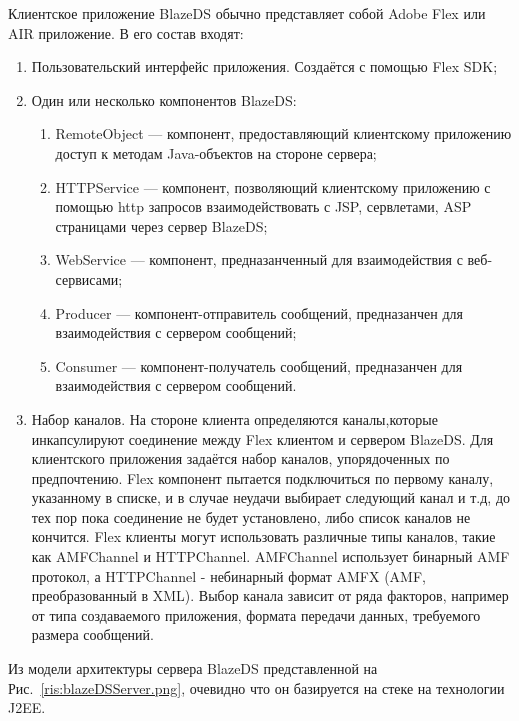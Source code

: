 Клиентское приложение BlazeDS обычно представляет собой Adobe Flex или AIR приложение. В его состав входят: 

\begin{enumerate}
\item Пользовательский интерфейс приложения. Создаётся с помощью Flex SDK;
\item Один или несколько компонентов BlazeDS: 
\begin{enumerate}
\item RemoteObject --- компонент, предоставляющий клиентскому приложению доступ к методам Java-объектов на стороне сервера; 
\item HTTPService --- компонент, позволяющий клиентскому приложению с помощью http запросов взаимодействовать с JSP, сервлетами, 
ASP страницами через сервер BlazeDS;
\item WebService --- компонент, предназанченный для взаимодействия с веб-сервисами;
\item Producer --- компонент-отправитель сообщений, предназанчен для взаимодействия с сервером сообщений;
\item Consumer --- компонент-получатель сообщений, предназанчен для взаимодействия с сервером сообщений.
\end{enumerate}
\item Набор каналов. На стороне клиента определяются каналы,которые инкапсулируют соединение между Flex клиентом и сервером 
BlazeDS. Для клиентского приложения задаётся набор каналов, упорядоченных по предпочтению. Flex компонент пытается подключиться 
по первому каналу, указанному в списке, и в случае неудачи выбирает следующий канал и т.д, до тех пор пока соединение не будет 
установлено, либо список каналов не кончится. Flex клиенты могут использовать различные типы каналов, такие как AMFChannel и
HTTPChannel. AMFChannel использует бинарный AMF протокол, а HTTPChannel - небинарный формат AMFX (AMF, преобразованный в XML). 
Выбор канала зависит от ряда факторов, например от типа создаваемого приложения, формата передачи данных, требуемого размера 
сообщений.
\end{enumerate}

Из модели архитектуры сервера BlazeDS представленной на Рис.~\ref{ris:blazeDSServer.png}, очевидно что он базируется
на стеке на технологии J2EE.

